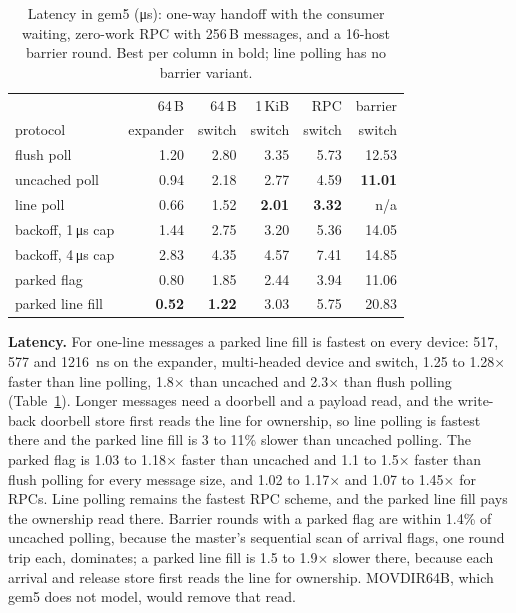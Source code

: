 \documentclass[journal]{IEEEtran}
\begin{document}
\begin{table}[t]
\centering
\caption{Latency in gem5 (\si{\micro\second}): one-way handoff with the consumer waiting, zero-work RPC with
256\,B messages, and a 16-host barrier round. Best per column in bold; line polling has no
barrier variant.}
\label{tab:lat}
\scriptsize\setlength{\tabcolsep}{3.5pt}
\begin{tabular}{@{}lrrrrr@{}}
\toprule
 & 64\,B & 64\,B & 1\,KiB & RPC & barrier \\
protocol & expander & switch & switch & switch & switch \\
\midrule
flush poll & 1.20 & 2.80 & 3.35 & 5.73 & 12.53 \\
uncached poll & 0.94 & 2.18 & 2.77 & 4.59 & \textbf{11.01} \\
line poll & 0.66 & 1.52 & \textbf{2.01} & \textbf{3.32} & n/a \\
backoff, 1\,\si{\micro\second} cap & 1.44 & 2.75 & 3.20 & 5.36 & 14.05 \\
backoff, 4\,\si{\micro\second} cap & 2.83 & 4.35 & 4.57 & 7.41 & 14.85 \\
parked flag & 0.80 & 1.85 & 2.44 & 3.94 & 11.06 \\
parked line fill & \textbf{0.52} & \textbf{1.22} & 3.03 & 5.75 & 20.83 \\
\bottomrule
\end{tabular}
\end{table}

\textbf{Latency.} For one-line messages a parked line fill is fastest on every device: 517, 577 and
\SI{1216}{\nano\second} on the expander, multi-headed device and switch, 1.25 to 1.28$\times$ faster
than line polling, 1.8$\times$ than uncached and 2.3$\times$ than flush polling
(Table~\ref{tab:lat}). Longer messages need a doorbell and a payload read, and the write-back
doorbell store first reads the line for ownership, so line polling is fastest there and the parked
line fill is 3 to 11\% slower than uncached polling. The parked flag is 1.03 to 1.18$\times$ faster
than uncached and 1.1 to 1.5$\times$ faster than flush polling for every message size, and 1.02 to
1.17$\times$ and 1.07 to 1.45$\times$ for RPCs. Line polling remains the fastest RPC scheme, and the
parked line fill pays the ownership read there. Barrier
rounds with a parked flag are within 1.4\% of uncached polling, because the master's sequential scan
of arrival flags, one round trip each, dominates; a parked line fill is 1.5 to 1.9$\times$ slower
there, because each arrival and release store first reads the line for ownership. MOVDIR64B, which
gem5 does not model, would remove that read.
\end{document}
